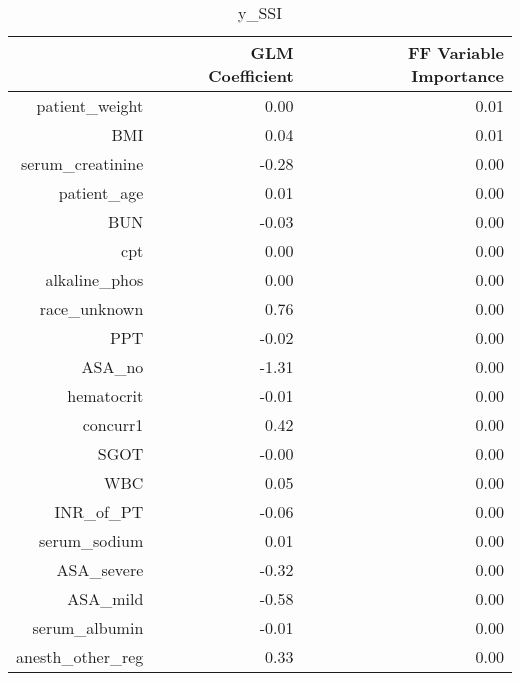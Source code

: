 \begin{table}[ht]
\centering
\begin{tabular}{rrr}
  \hline
 & GLM Coefficient & FF Variable Importance \\ 
  \hline
patient\_weight & 0.00 & 0.01 \\ 
  BMI & 0.04 & 0.01 \\ 
  serum\_creatinine & -0.28 & 0.00 \\ 
  patient\_age & 0.01 & 0.00 \\ 
  BUN & -0.03 & 0.00 \\ 
  cpt & 0.00 & 0.00 \\ 
  alkaline\_phos & 0.00 & 0.00 \\ 
  race\_unknown & 0.76 & 0.00 \\ 
  PPT & -0.02 & 0.00 \\ 
  ASA\_no & -1.31 & 0.00 \\ 
  hematocrit & -0.01 & 0.00 \\ 
  concurr1 & 0.42 & 0.00 \\ 
  SGOT & -0.00 & 0.00 \\ 
  WBC & 0.05 & 0.00 \\ 
  INR\_of\_PT & -0.06 & 0.00 \\ 
  serum\_sodium & 0.01 & 0.00 \\ 
  ASA\_severe & -0.32 & 0.00 \\ 
  ASA\_mild & -0.58 & 0.00 \\ 
  serum\_albumin & -0.01 & 0.00 \\ 
  anesth\_other\_reg & 0.33 & 0.00 \\ 
   \hline
\end{tabular}
\caption{y_SSI} 
\end{table}

